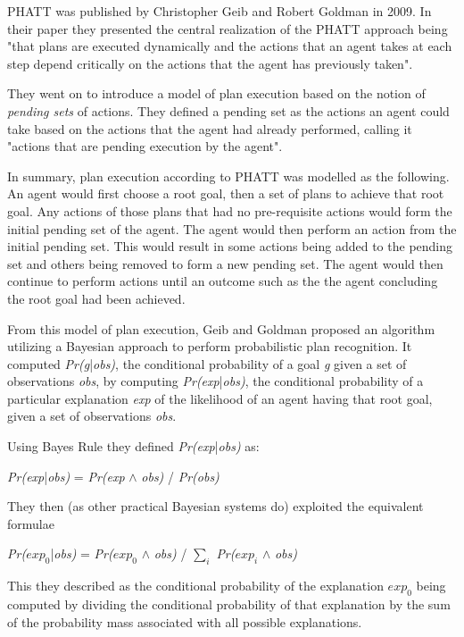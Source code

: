\documentclass[parskip]{cs4rep}
\begin{document}
PHATT was published by Christopher Geib and Robert Goldman in 2009. In their paper they presented the central realization of the PHATT approach being "that plans are executed dynamically and the actions that an agent takes at each step depend critically on the actions that the agent has previously taken". 

They went on to introduce a model of plan execution based on the notion of \textit{pending sets} of actions. They defined a pending set as the actions an agent could take based on the actions that the agent had already performed, calling it "actions that are pending execution by the agent".

In summary, plan execution according to PHATT was modelled as the following. An agent would first choose a root goal, then a set of plans to achieve that root goal. Any actions of those plans that had no pre-requisite actions would form the initial pending set of the agent. The agent would then perform an action from the initial pending set. This would result in some actions being added to the pending set and others being removed to form a new pending set. The agent would then continue to perform actions until an outcome such as the the agent concluding the root goal had been achieved.

From this model of plan execution, Geib and Goldman proposed an algorithm utilizing a Bayesian approach to perform probabilistic plan recognition. It computed \textit{Pr(g}|\textit{obs)}, the conditional probability of a goal \textit{g} given a set of observations \textit{obs}, by computing \textit{Pr(exp}|\textit{obs)}, the conditional probability of a particular explanation \textit{exp} of the likelihood of an agent having that root goal, given a set of observations \textit{obs}.

Using Bayes Rule they defined \textit{Pr(exp}|\textit{obs)} as:\newline

\centerline{
\textit{Pr(exp}|\textit{obs)} = \textit{Pr(exp} $\wedge$ \textit{obs)} / \textit{Pr(obs)}
}

They then (as other practical Bayesian systems do) exploited the equivalent formulae\newline

\centerline{
\textit{Pr($exp_0$}|\textit{obs)} = \textit{Pr($exp_0$} $\wedge$ \textit{obs)} / $\displaystyle\sum\nolimits_{i}$ \textit{Pr($exp_i$} $\wedge$ \textit{obs)}
}

This they described as the conditional probability of the explanation $exp_0$ being computed by dividing the conditional probability of that explanation by the sum of the probability mass associated with all possible explanations.
\end{document}
